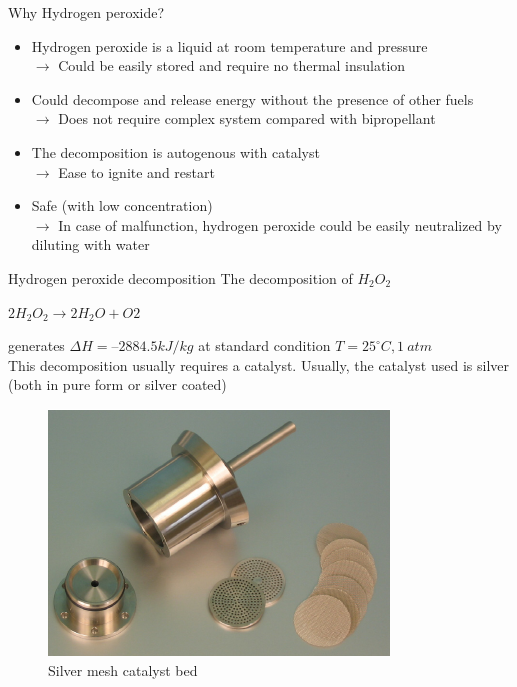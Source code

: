 \documentclass{beamer}
\begin{document}
\begin{frame}{Why Hydrogen peroxide?}
    \begin{itemize}
        \item Hydrogen peroxide is a liquid at room temperature and pressure \\ $\rightarrow$ Could be easily stored and require no thermal insulation
        \item Could decompose and release energy without the presence of other fuels 
        \\ $\rightarrow$ Does not require complex system compared with bipropellant
        \item The decomposition is autogenous with catalyst 
        \\$\rightarrow$ Ease to ignite and restart
        \item Safe (with low concentration) 
        \\$\rightarrow$ In case of malfunction, hydrogen peroxide could be easily neutralized by diluting with water
    \end{itemize}
\end{frame}

\begin{frame}{Hydrogen peroxide decomposition}
    The decomposition of $H_2O_2$ \\
    \begin{center}
        $2H_2O_2 \rightarrow 2 H_2O + O2$ \        
    \end{center} 
    generates $\Delta H = –2884.5 kJ/kg$ at standard condition $T=25^{\circ}C, 1\:atm$ \\

    This decomposition usually requires a catalyst. Usually, the catalyst used is silver (both in pure form or silver coated) \\

    \begin{figure}
        \centering
        \includegraphics[height=0.35\textheight]{images/Catalyst-bed-composition.png}
        \caption{Silver mesh catalyst bed}
    \end{figure}
\end{frame}
\end{document}
